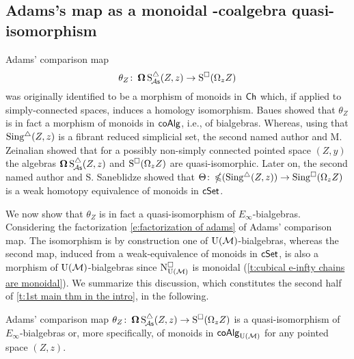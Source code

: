 %


\subsection{Adams's map as a monoidal \pdfEinfty-coalgebra quasi-isomorphism}

Adams' comparison map
\[
\theta_Z \colon \operatorname{\mathbf{\Omega}} \operatorname{S^{\triangle}_{\!{\mathcal{A}\mathsf{s}}}}(Z,z) \to \operatorname{S^{\square}}(\Omega_z Z)
\]
was originally identified to be a morphism of monoids in $\mathsf{Ch}$ which, if applied to simply-connected spaces, induces a homology isomorphism.
Baues showed that $\theta_Z$ is in fact a morphism of monoids in $\mathsf{coAlg}$, i.e., of bialgebras.
Whereas, using that $\operatorname{Sing^{\triangle}}(Z,z)$ is a fibrant reduced simplicial set, the second named author and M. Zeinalian \cite{rivera2018cubical} showed that for a possibly non-simply connected pointed space $(Z,y)$ the algebras $\operatorname{\mathbf{\Omega}} \operatorname{S^{\triangle}_{\!{\mathcal{A}\mathsf{s}}}}(Z,z)$ and $\operatorname{S^{\square}}(\Omega_zZ)$ are quasi-isomorphic.
Later on, the second named author and S. Saneblidze
\cite{rivera2019path} showed that $\Theta \colon \operatorname{\mathbb{\Omega}}(\operatorname{Sing^{\triangle}}(Z,z)) \to \operatorname{Sing^{\square}}(\Omega_z Z)$ is a weak homotopy equivalence of monoids in $\mathsf{cSet}$.

We now show that $\theta_Z$ is in fact a quasi-isomorphism of $E_{\infty}$-bialgebras.
Considering the factorization \eqref{e:factorization of adams} of Adams' comparison map.
The isomorphism is by construction one of ${\operatorname{U}(\mathcal{M})}$-bialgebras, whereas the second map, induced from a weak-equivalence of monoids in $\mathsf{cSet}$, is also a morphism of ${\operatorname{U}(\mathcal{M})}$-bialgebras
since $\operatorname{N^{\square}_{{\operatorname{U}(\mathcal{M})}}}$ is monoidal (\cref{t:cubical e-infty chains are monoidal}).
We summarize this discussion, which constitutes the second half of \cref{t:1st main thm in the intro}, in the following.

\begin{lemma}\label{l:adams comparison is an e-infty bialgebra map}
	Adams' comparison map $\theta_Z \colon \operatorname{\mathbf{\Omega}} \operatorname{S^{\triangle}_{\!{\mathcal{A}\mathsf{s}}}}(Z,z) \to \operatorname{S^{\square}}(\Omega_z Z)$ is a quasi-isomorphism of $E_{\infty}$-bialgebras or, more specifically, of monoids in $\mathsf{coAlg}_{\operatorname{U}(\mathcal{M})}$ for any pointed space $(Z,z)$.
\end{lemma}